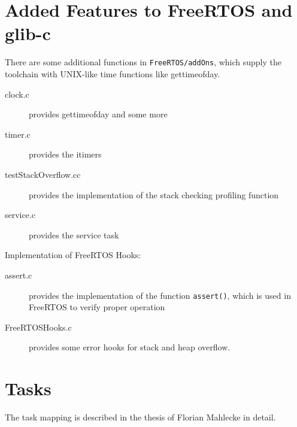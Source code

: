 \section{Added Features to FreeRTOS and glib-c}
There are some additional functions in \texttt{FreeRTOS/addOns},
 which supply the toolchain
with UNIX-like time functions like gettimeofday.
\begin{description}
\item[clock.c]provides gettimeofday and some more
\item[timer.c] provides the itimers
\item[testStackOverflow.cc] provides the implementation of the 
  stack checking profiling function
\item[service.c] provides the service task
\end{description}

Implementation of FreeRTOS Hooks:
\begin{description}
\item[assert.c] provides the implementation of the function
  \texttt{assert()}, which is used in FreeRTOS to verify
  proper operation
\item[FreeRTOSHooks.c] provides some error hooks for stack and heap overflow.
\end{description}

\section{Tasks}
\label{freertos_tasking}

The task mapping is described in the thesis of
 Florian Mahlecke in detail.

